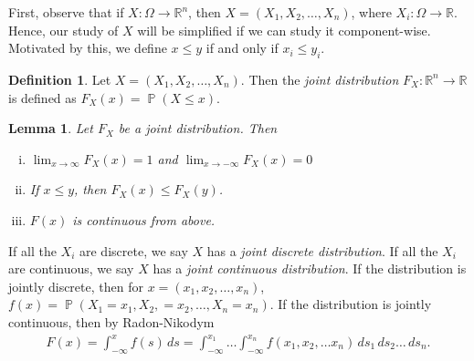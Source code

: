 \documentclass[12pt]{amsbook}
\newcommand{\rr}{\mathbb{R}}
\DeclareMathOperator{\prob}{\mathbb{P}}
\theoremstyle{plain}
\newtheorem{lemma}[theorem]{Lemma}
\theoremstyle{definition}
\newtheorem*{definition}{Definition}
\theoremstyle{remark}
\numberwithin{equation}{section}  %
\begin{document}
First, observe that if ${X}: \Omega \to \rr^n$, then $X = (X_1, X_2,
\ldots, X_n)$, where $X_i: \Omega \to \rr$. Hence, our study of $X$ will be
simplified if we can study it component-wise. Motivated by this, we define
$x \le y$ if and only if $x_i \le y_i$. 
\begin{definition}
	Let ${X} = (X_1, X_2, \ldots, X_n)$. Then the \emph{joint distribution}
	$F_X: \rr^n \to \rr$
	is defined as $F_X(x) = \prob({X} \le x)$.
	\begin{lemma}
		Let $F_X$ be a joint distribution. Then
		\begin{enumerate}[(i)]
			\item
				$\lim_{x \to \infty} F_X(x) = 1$ and $\lim_{x \to -\infty}
				F_X(x) = 0$
			\item
				If $x \le y$, then $F_X(x) \le F_X(y)$.
			\item
				$F(x)$ is continuous from above.
		\end{enumerate}
	\end{lemma}
	If all the $X_i$ are discrete, we say $X$ has a \emph{joint discrete
	distribution}. If all the $X_i$ are continuous, we say $X$ has a 
	\emph{joint continuous distribution}. If the distribution is jointly 
	discrete,
	then for $x = (x_1, x_2, \ldots, x_n)$,
	$f(x) = \prob(X_1 = x_1, X_2, = x_2,
	\ldots, X_n = x_n)$. If the distribution is jointly continuous, then by
	Radon-Nikodym
	\begin{align*}
		F(x) = \int_{-\infty}^x f(s) \, ds = \int_{-\infty}^{x_1} \ldots
		\int_{-\infty}^{x_n} f(x_1, x_2, \ldots x_n) \, ds_1 \, ds_2 \ldots \, 
		ds_n.
	\end{align*}


\end{definition}
\end{document}
